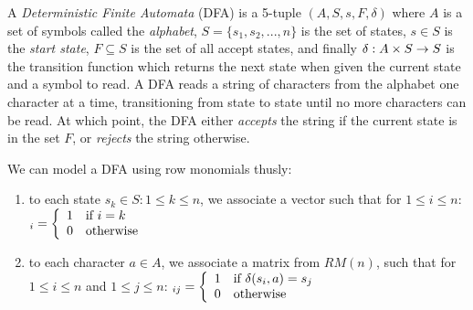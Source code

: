 A \emph{Deterministic Finite Automata} (DFA) is a 5-tuple
$(A,S,s,F,\delta)$ where $A$ is a set of symbols called the
\emph{alphabet}, $S = \{ s_1, s_2, ..., n \} $ is the set of states,
$s \in S$ is the \emph{start state}, $F \subseteq S$ is the set of all
accept states, and finally $\delta: A \times S \rightarrow S$ is the
transition function which returns the next state when given the
current state and a symbol to read.  A DFA reads a string of
characters from the alphabet one character at a time, transitioning
from state to state until no more characters can be read.  At which
point, the DFA either \emph{accepts} the string if the current state
is in the set $F$, or \emph{rejects} the string otherwise.

We can model a DFA using row monomials thusly:

\begin{enumerate}
\item to each state $s_k \in S : 1 \leq k \leq n$, we associate a vector
  such that for $1 \leq i \leq n$:
  \begin{math}
    [s]_i = \left\{
      \begin{array}{l l}
        1 & \text{if } i = k \\
        0 & \text{otherwise}
      \end{array} \right.
  \end{math}

\item to each character $a \in A$, we associate a matrix from $RM(n)$,
  such that for $1 \leq i \leq n$ and $1 \leq j \leq n$:
  \begin{math}
    [a]_{ij} = \left\{
      \begin{array}{l l}
        1 & \text{if } \delta(s_i,a) = s_j \\
        0 & \text{otherwise}
      \end{array} \right.
  \end{math}
\end{enumerate}